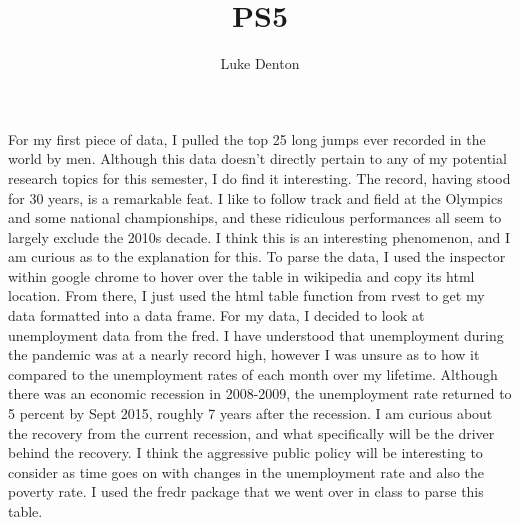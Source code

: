 \documentclass{homework}
\title{PS5}
\author{Luke Denton}
\begin{document}
\maketitle

\exercise
For my first piece of data, I pulled the top 25 long jumps ever recorded in the world by men. Although this data doesn't directly pertain to any of my potential research topics for this semester, I do find it interesting. The record, having stood for 30 years, is a remarkable feat. I like to follow track and field at the Olympics and some national championships, and these ridiculous performances all seem to largely exclude the 2010s decade. I think this is an interesting phenomenon, and I am curious as to the explanation for this. To parse the data, I used the inspector within google chrome to hover over the table in wikipedia and copy its html location. From there, I just used the html table function from rvest to get my data formatted into a data frame. 
\exercise*
For my data, I decided to look at unemployment data from the fred. I have understood that unemployment during the pandemic was at a nearly record high, however I was unsure as to how it compared to the unemployment rates of each month over my lifetime. Although there was an economic recession in 2008-2009, the unemployment rate returned to 5 percent by Sept 2015, roughly 7 years after the recession. I am curious about the recovery from the current recession, and what specifically will be the driver behind the recovery. I think the aggressive public policy will be interesting to consider as time goes on with changes in the unemployment rate and also the poverty rate. I used the fredr package that we went over in class to parse this table.
\end{document}
